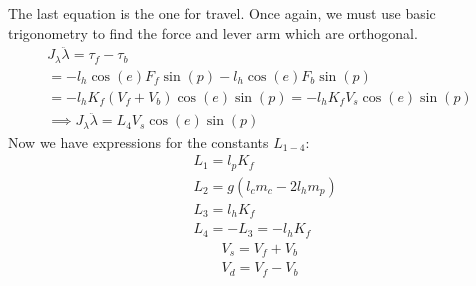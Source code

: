 The last equation is the one for travel. Once again, we must use basic trigonometry to find the force and lever arm which are orthogonal. 
\begin{gather*}
    J_\lambda \ddot{\lambda} = \tau_f - \tau_b \\
    = - l_h \cos(e) F_f \sin(p) - l_h \cos(e) F_b \sin(p)\\
    = - l_h K_f (V_f + V_b) \cos(e) \sin(p) = - l_h K_f V_s \cos(e) \sin(p)\\
    \implies J_\lambda \ddot{\lambda} = L_4 V_s \cos(e) \sin(p)
\end{gather*}
Now we have expressions for the constants $L_{1-4}$:
\begin{subequations}\label{eq:constants-L}
    \begin{align}
        & L_1 = l_p K_f \label{eq:constant-L1}\\
        & L_2 = g (l_c m_c - 2 l_h m_p) \label{eq:constant-L2}\\
        & L_3 = l_h K_f \label{eq:constant-L3} \\
        & L_4 = - L_3 = - l_h K_f \label{eq:constant-L4}
    \end{align}
\end{subequations}
\begin{subequations}\label{eq:motor_voltage}
    \begin{gather}
        V_s = V_f + V_b \label{motor_voltage_sum}\\
        V_d = V_f - V_b \label{motor_voltage_difference}
    \end{gather}
\end{subequations}
